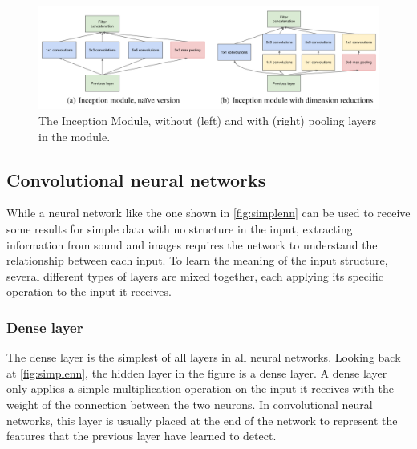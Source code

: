 \begin{figure}[htbp]  %
  \centering
  \includegraphics[width=.7\textwidth]{figures/google2.PNG}
  \caption{The Inception Module\cite{szegedy2014going}, without (left) and with (right) pooling layers in the module.}
  \label{fig:inception}
\end{figure}

\subsection{Convolutional neural networks}

While a neural network like the one shown in \cref{fig:simplenn} can be used to receive some results for simple data with no structure in the input, extracting information from sound and images requires the network to understand the relationship between each input. 
To learn the meaning of the input structure, several different types of layers are mixed together, each applying its specific operation to the input it receives. 




\subsubsection{Dense layer}
The dense layer is the simplest of all layers in all neural networks.
Looking back at \cref{fig:simplenn}, the hidden layer in the figure is a dense layer.
A dense layer only applies a simple multiplication operation on the input it receives with the weight of the connection between the two neurons.
In convolutional neural networks, this layer is usually placed at the end of the network to represent the features that the previous layer have learned to detect.


